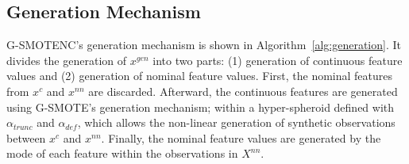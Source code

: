 \subsection{Generation Mechanism}

G-SMOTENC's generation mechanism is shown in Algorithm~\ref{alg:generation}.
It divides the generation of $x^{gen}$ into two parts: (1) generation of
continuous feature values and (2) generation of nominal feature values.
First, the nominal features from $x^c$ and $x^{nn}$ are discarded. Afterward,
the continuous features are generated using G-SMOTE's generation mechanism;
within a hyper-spheroid defined with $\alpha_{trunc}$ and $\alpha_{def}$,
which allows the non-linear generation of synthetic observations between $x^c$
and $x^{nn}$. Finally, the nominal feature values are generated by the mode of
each feature within the observations in $X^{nn}$.

